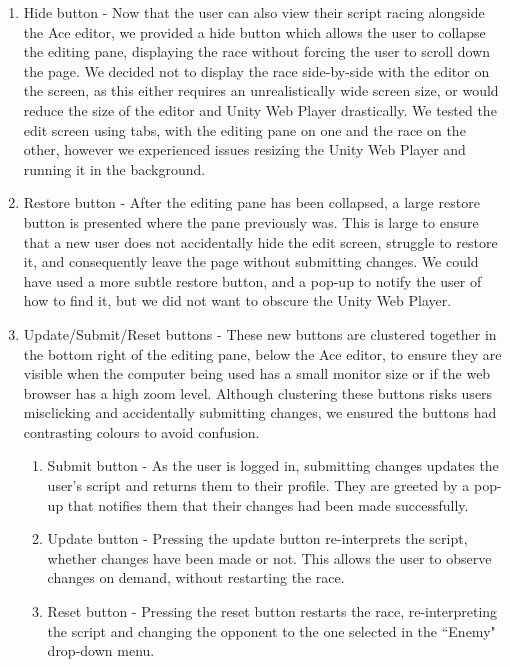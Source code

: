 \begin{enumerate}
\item Hide button - Now that the user can also view their script racing alongside the Ace editor, we provided a hide button which allows the user to collapse the editing pane, displaying the race without forcing the user to scroll down the page. We decided not to display the race side-by-side with the editor on the screen, as this either requires an unrealistically wide screen size, or would reduce the size of the editor and Unity Web Player drastically. We tested the edit screen using tabs, with the editing pane on one and the race on the other, however we experienced issues resizing the  Unity Web Player and running it in the background.
\item Restore button - After the editing pane has been collapsed, a large restore button is presented where the pane previously was. This is large to ensure that a new user does not accidentally hide the edit screen, struggle to restore it, and consequently leave the page without submitting changes. We could have used a more subtle restore button, and a pop-up to notify the user of how to find it, but we did not want to obscure the Unity Web Player.
\item Update/Submit/Reset buttons - These new buttons are clustered together in the bottom right of the editing pane, below the Ace editor, to ensure they are visible when the computer being used has a small monitor size or if the web browser has a high zoom level. Although clustering these buttons risks users misclicking and accidentally submitting changes, we ensured the buttons had contrasting colours to avoid confusion.
	\begin{enumerate}
	\item Submit button - As the user is logged in, submitting changes updates the user's script and returns them to their profile. They are greeted by a pop-up that notifies them that their changes had been made successfully.
	\item Update button - Pressing the update button re-interprets the script, whether changes have been made or not. This allows the user to observe changes on demand, without restarting the race. 
	\item Reset button - Pressing the reset button restarts the race, re-interpreting the script and changing the opponent to the one selected in the ``Enemy" drop-down menu.
	\end{enumerate}
\end{enumerate}

